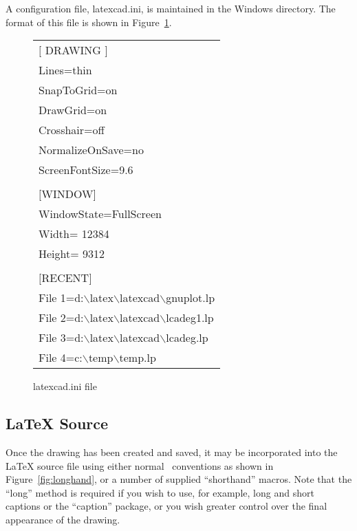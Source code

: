 \documentclass[a4paper]{article}
\newcommand{\bs}{$\backslash$}
\begin{document}
A configuration file, latexcad.ini, is maintained in the Windows
directory. The format of this file is shown in Figure~\ref{fig:inifile}.

\begin{figure}
    \begin{center}
    \begin{tabular}{l}
        \hline
        $[$ DRAWING $]$ \\
        Lines=thin \\
        SnapToGrid=on \\
        DrawGrid=on \\
        Crosshair=off\\
        NormalizeOnSave=no \\
        ScreenFontSize=9.6\\
        \\
        $[$WINDOW$]$ \\
        WindowState=FullScreen \\
        Width= 12384 \\
        Height= 9312 \\
        \\
        $[$RECENT$]$ \\
        File 1=d:\bs latex\bs latexcad\bs gnuplot.lp \\
        File 2=d:\bs latex\bs latexcad\bs lcadeg1.lp \\
        File 3=d:\bs latex\bs latexcad\bs lcadeg.lp \\
        File 4=c:\bs temp\bs temp.lp \\
        \hline\hline
    \end{tabular}
    \caption{latexcad.ini file}
    \label{fig:inifile}
    \end{center}
\end{figure}


\subsection{ \LaTeX\/ Source } \label{sec:source}
Once the drawing has been created and saved, it may be incorporated
into the \LaTeX\/ source file using either normal \LaTeXe\ conventions
as shown in Figure~\ref{fig:longhand}, or a number of supplied
``shorthand'' macros. Note that the ``long'' method is required if you
wish to use, for example, long and short captions or the ``caption''
package, or you wish greater control over the final appearance of the drawing.
\end{document}
